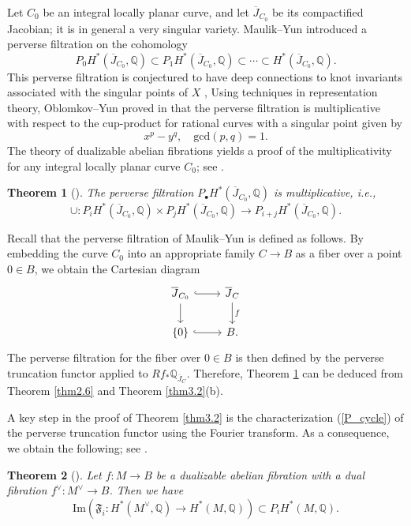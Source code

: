 \documentclass[11pt]{amsart}
\theoremstyle{plain}
\newtheorem{thm}{Theorem}[section]
\theoremstyle{definition}
\theoremstyle{remark}
\newcommand{\BQ}{{\mathbb{Q}}}
\begin{document}
\medskip
{}
Let $C_0$ be an integral locally planar curve, and let $\overline{J}_{C_0}$ be its compactified Jacobian; it is in general a very singular variety. Maulik--Yun \cite{MY} introduced a perverse filtration on the cohomology
\[
P_0H^*(\overline{J}_{C_0}, \BQ) \subset P_1H^*(\overline{J}_{C_0}, \BQ) \subset \cdots \subset H^*(\overline{J}_{C_0}, \BQ).
\]
This perverse filtration is conjectured to have deep connections to knot invariants associated with the singular points of $X$ \cite{ORS, Shen_survey}, Using techniques in representation theory, Oblomkov--Yun proved in \cite{OY} that the perverse filtration is multiplicative with respect to the cup-product for rational curves with a singular point given by 
\[
x^p-y^q, \quad \mathrm{gcd}(p,q)=1.
\]
The theory of dualizable abelian fibrations yields a proof of the multiplicativity for any integral locally planar curve $C_0$; see \cite[Theorem 0.7]{MSY}.

\begin{thm}[\cite{MSY}]\label{thm3.6}
    The perverse filtration $P_\bullet H^*(\overline{J}_{C_0}, \BQ)$ is multiplicative, \emph{i.e.},
    \[
\cup:    P_iH^*(\overline{J}_{C_0}, \BQ) \times P_{j}H^*(\overline{J}_{C_0}, \BQ) \to P_{i+j} H^*(\overline{J}_{C_0}, \BQ).
    \]
\end{thm}

Recall that the perverse filtration of Maulik--Yun is defined as follows. By embedding the curve $C_0$ into an appropriate family $C \to B$ as a fiber over a point $0\in B$, we obtain the Cartesian diagram
\[
\begin{tikzcd}
\overline{J}_{C_0} \arrow[r, hook, ""] \arrow[d, ""] & \overline{J}_C \arrow[d, " f"] \\
\{0\} \arrow[r, hook, " "] & B.
\end{tikzcd}
\] 
The perverse filtration for the fiber over $0\in B$ is then defined by the perverse truncation functor applied to $Rf_* \BQ_{\overline{J}_C}$. Therefore, Theorem \ref{thm3.6} can be deduced from Theorem \ref{thm2.6} and Theorem \ref{thm3.2}(b).


\medskip
{} A key step in the proof of Theorem \ref{thm3.2} is the characterization (\ref{P_cycle}) of the perverse truncation functor using the Fourier transform. As a consequence, we obtain the following; see \cite[Theorem 0.1]{MSY}.

\begin{thm}[\cite{MSY}]\label{thm3.77}
    Let $f: M\to B$ be a dualizable abelian fibration with a dual fibration $f^\vee: M^\vee \to B$. Then we have
    \[
\mathrm{Im}\left(\mathfrak{F}_i: H^*(M^\vee, \BQ) \to H^*(M, \BQ)\right) \subset P_iH^*(M, \BQ).
    \]
\end{thm}
\end{document}
